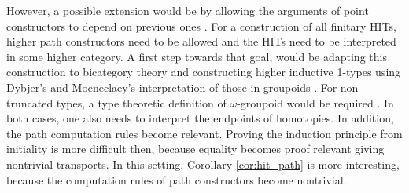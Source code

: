 \documentclass[9pt]{entcs}
\newcommand{\0}{\textbf{0}} %
\begin{document}
However, a possible extension would be by allowing the arguments of point constructors to depend on previous ones \cite{AltenkirchCDKF18}.
For a construction of all finitary HITs, higher path constructors need to be allowed and the HITs need to be interpreted in some higher category.
A first step towards that goal, would be adapting this construction to bicategory theory \cite{ahrens2019bicategories,capriotti2017univalent} and constructing higher inductive 1-types using Dybjer's and Moeneclaey's interpretation of those in groupoids \cite{DybjerM18}.
For non-truncated types, a type theoretic definition of $\omega$-groupoid would be required \cite{DBLP:conf/csl/AltenkirchR12,capriotti2017univalent,DBLP:conf/lics/FinsterM17,DBLP:conf/tlca/HirschowitzHT15}.
In both cases, one also needs to interpret the endpoints of homotopies.
In addition, the path computation rules become relevant.
Proving the induction principle from initiality is more difficult then, because equality becomes proof relevant giving nontrivial transports.
In this setting, Corollary \ref{cor:hit_path} is more interesting, because the computation rules of path constructors become nontrivial.
\end{document}
